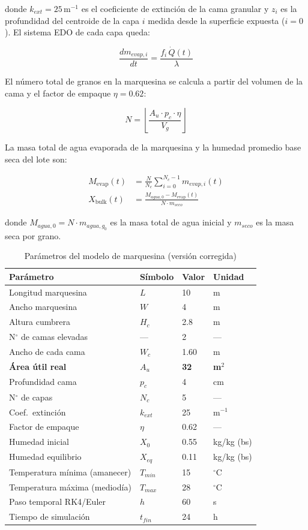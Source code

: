 \documentclass[conference]{IEEEtran}
\begin{document}
donde $k_{ext} = 25\,\text{m}^{-1}$ es el coeficiente de extinción de la cama granular y $z_i$ es la profundidad del centroide de la capa $i$ medida desde la superficie expuesta ($i=0$). El sistema EDO de cada capa queda:

\begin{equation}
\frac{dm_{evap,i}}{dt} = \frac{f_i\,\dot{Q}(t)}{\lambda}
\label{eq:ode_capa}
\end{equation}

El número total de granos en la marquesina se calcula a partir del volumen de la cama y el factor de empaque $\eta = 0.62$:

\begin{equation}
N = \left\lfloor \frac{A_u \cdot p_c \cdot \eta}{V_g} \right\rfloor
\label{eq:ngranos}
\end{equation}

La masa total de agua evaporada de la marquesina y la humedad promedio base seca del lote son:

\begin{align}
M_{\text{evap}}(t) &= \frac{N}{N_c}\sum_{i=0}^{N_c-1} m_{evap,i}(t)
\label{eq:M_evap} \\[4pt]
X_{\text{bulk}}(t) &= \frac{M_{agua,0} - M_{\text{evap}}(t)}{N \cdot m_{seco}}
\label{eq:X_bulk}
\end{align}

donde $M_{agua,0} = N \cdot m_{agua,g_0}$ es la masa total de agua inicial y $m_{seco}$ es la masa seca por grano.

\begin{table}[H]
\centering
\caption{Parámetros del modelo de marquesina (versión corregida)}
\begin{tabular}{llll}
\toprule
Parámetro & Símbolo & Valor & Unidad \\
\midrule
Longitud marquesina & $L$ & 10 & m \\
Ancho marquesina & $W$ & 4 & m \\
Altura cumbrera & $H_c$ & 2.8 & m \\
N$^\circ$ de camas elevadas & — & 2 & — \\
Ancho de cada cama & $W_c$ & 1.60 & m \\
\textbf{Área útil real} & $A_u$ & \textbf{32} & \textbf{m$^2$} \\
Profundidad cama & $p_c$ & 4 & cm \\
N$^\circ$ de capas & $N_c$ & 5 & — \\
Coef.\ extinción & $k_{ext}$ & 25 & m$^{-1}$ \\
Factor de empaque & $\eta$ & 0.62 & — \\
Humedad inicial & $X_0$ & 0.55 & kg/kg (bs) \\
Humedad equilibrio & $X_{eq}$ & 0.11 & kg/kg (bs) \\
Temperatura mínima (amanecer) & $T_{min}$ & 15 & $^{\circ}$C \\
Temperatura máxima (mediodía) & $T_{max}$ & 28 & $^{\circ}$C \\
Paso temporal RK4/Euler & $h$ & 60 & s \\
Tiempo de simulación & $t_{fin}$ & 24 & h \\
\bottomrule
\end{tabular}
\end{table}
\end{document}
